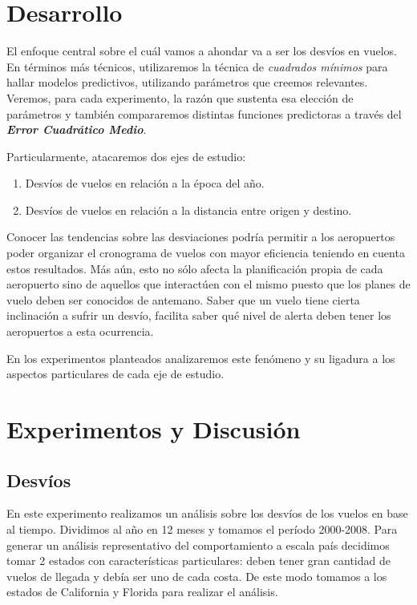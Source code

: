 \documentclass{endm}
\begin{document}
\section{Desarrollo}

El enfoque central sobre el cu\'al vamos a ahondar va a ser los desv\'ios en vuelos. En t\'erminos m\'as t\'ecnicos, utilizaremos la t\'ecnica de \textit{cuadrados m\'inimos} para hallar modelos predictivos, utilizando par\'ametros que creemos relevantes. Veremos, para cada experimento, la raz\'on que sustenta esa elecci\'on de par\'ametros y tambi\'en compararemos distintas funciones predictoras a trav\'es del \textbf{\textit{Error Cuadr\'atico Medio}}.

Particularmente, atacaremos dos ejes de estudio:

\begin{enumerate}
\item Desv\'ios de vuelos en relaci\'on a la \'epoca del a\~no.
\item Desv\'ios de vuelos en relaci\'on a la distancia entre origen y destino.
\end{enumerate}

Conocer las tendencias sobre las desviaciones podr\'ia permitir a los aeropuertos poder organizar el cronograma de vuelos con mayor eficiencia teniendo en cuenta estos resultados. M\'as a\'un, esto no s\'olo afecta la planificaci\'on propia de cada aeropuerto sino de aquellos que interact\'uen con el mismo puesto que los planes de vuelo deben ser conocidos de antemano. Saber que un vuelo tiene cierta inclinaci\'on a sufrir un desv\'io, facilita saber qu\'e nivel de alerta deben tener los aeropuertos a esta ocurrencia.

En los experimentos planteados analizaremos este fen\'omeno y su ligadura a los aspectos particulares de cada eje de estudio.
\newpage

\section{Experimentos y Discusi\'on}

\subsection{Desv\'ios}

En este experimento realizamos un an\'alisis sobre los desv\'ios de los vuelos en base al tiempo. Dividimos al a\~no en 12 meses y tomamos el per\'iodo 2000-2008. Para generar un an\'alisis representativo del comportamiento a escala pa\'is decidimos tomar 2 estados con caracter\'isticas particulares: deben tener gran cantidad de vuelos de llegada y deb\'ia ser uno de cada costa. De este modo tomamos a los estados de California y Florida para realizar el an\'alisis.
\end{document}
